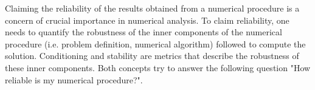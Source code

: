 \documentclass[../main.tex]{subfiles}
\begin{document}
	
	\par Claiming the reliability of the results obtained from a numerical procedure is a concern of crucial importance in numerical analysis. To claim reliability, one needs to quantify the robustness of the inner components of the numerical procedure (i.e. problem definition, numerical algorithm) followed to compute the solution. Conditioning and stability are metrics that describe the robustness of these inner components. Both concepts try to answer the following question "How reliable is my numerical procedure?".
\end{document}
